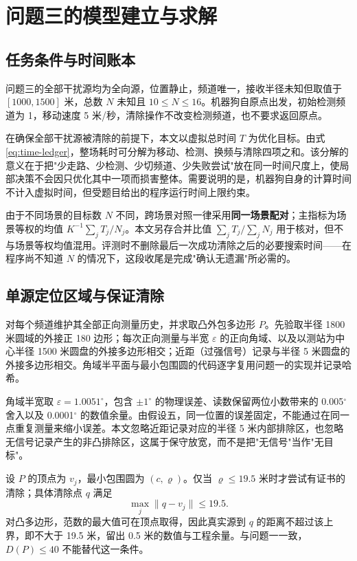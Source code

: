 \section{问题三的模型建立与求解}

\subsection{任务条件与时间账本}

问题三的全部干扰源均为全向源，位置静止，频道唯一，接收半径未知但取值于 $[1000,1500]$ 米，总数 $N$ 未知且 $10\le N\le16$。机器狗自原点出发，初始检测频道为 1，移动速度 5 米/秒，清除操作不改变检测频道，也不要求返回原点。

在确保全部干扰源被清除的前提下，本文以虚拟总时间 $T$ 为优化目标。由式 \eqref{eq:time-ledger}，整场耗时可分解为移动、检测、换频与清除四项之和。该分解的意义在于把"少走路、少检测、少切频道、少失败尝试"放在同一时间尺度上，使局部决策不会因只优化其中一项而损害整体。需要说明的是，机器狗自身的计算时间不计入虚拟时间，但受题目给出的程序运行时间上限约束。

由于不同场景的目标数 $N$ 不同，跨场景对照一律采用\textbf{同一场景配对}；主指标为场景等权的均值 $K^{-1}\sum_j T_j/N_j$。本文另存合并比值 $\sum_jT_j/\sum_jN_j$ 用于核对，但不与场景等权均值混用。评测时不删除最后一次成功清除之后的必要搜索时间——在程序尚不知道 $N$ 的情况下，这段收尾是完成"确认无遗漏"所必需的。

\subsection{单源定位区域与保证清除}

对每个频道维护其全部正向测量历史，并求取凸外包多边形 $P$。先验取半径 1800 米圆域的外接正 180 边形；每次正向测量与半宽 $\varepsilon$ 的正向角域、以及以测站为中心半径 1500 米圆盘的外接多边形相交；近距（过强信号）记录与半径 5 米圆盘的外接多边形相交。角域半平面与最小包围圆的代码逐字复用问题一的实现并记录哈希。

角域半宽取 $\varepsilon=1.0051^\circ$，包含 $\pm1^\circ$ 的物理误差、读数保留两位小数带来的 0.005$^\circ$ 舍入以及 0.0001$^\circ$ 的数值余量。由假设五，同一位置的误差固定，不能通过在同一点重复测量来缩小误差。本文忽略近距记录对应的半径 5 米内部排除区，也忽略无信号记录产生的非凸排除区，这属于保守放宽，而不是把"无信号"当作"无目标"。

设 $P$ 的顶点为 $v_j$，最小包围圆为 $(c,\varrho)$。仅当 $\varrho\le19.5$ 米时才尝试有证书的清除；具体清除点 $q$ 满足
\begin{equation}
  \max_j\lVert q-v_j\rVert\le19.5 .
  \label{eq:q3-clear}
\end{equation}
对凸多边形，范数的最大值可在顶点取得，因此真实源到 $q$ 的距离不超过该上界，即不大于 19.5 米，留出 0.5 米的数值与工程余量。与问题一一致，$D(P)\le40$ 不能替代这一条件。

